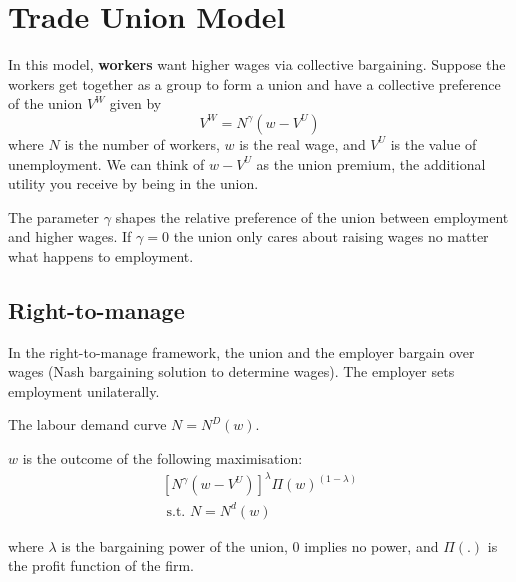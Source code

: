 \documentclass[11pt]{article}
\begin{document}
\section{Trade Union Model}

In this model, \textbf{workers} want higher wages via collective bargaining. Suppose the workers get together as a group to form a union and have a collective preference of the union $V^W$ given by
\[V^W = N^\gamma (w-V^U)\]
where $N$ is the number of workers, $w$ is the real wage, and $V^U$ is the value of unemployment. We can think of $w-V^U$ as the union premium, the additional utility you receive by being in the union.

The parameter $\gamma$ shapes the relative preference of the union between employment and higher wages. If $\gamma=0$ the union only cares about raising wages no matter what happens to employment.

\subsection{Right-to-manage}

\begin{shaded}
    In the right-to-manage framework, the union and the employer bargain over wages (Nash bargaining solution to determine wages). The employer sets employment unilaterally.

    The labour demand curve $N = N^D(w)$.
\end{shaded}

$w$ is the outcome of the following maximisation:
\begin{equation}
\begin{array}{r}
{\left[N^\gamma\left(w-V^U\right)\right]^\lambda \Pi(w)^{(1-\lambda)}} \\
\text { s.t. } N=N^d(w)
\end{array}
\end{equation}

where $\lambda$ is the bargaining power of the union, 0 implies no power, and $\Pi(.)$ is the profit function of the firm.
\end{document}
